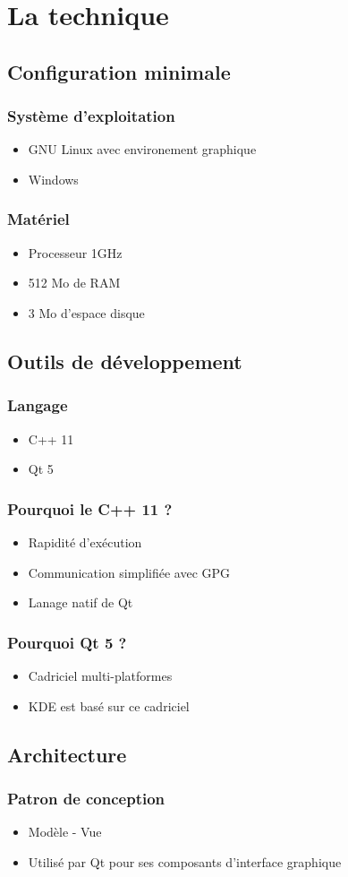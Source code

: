 \section{La technique}
\subsection{Configuration minimale}
\begin{frame}
  \frametitle{\color{white} Système d'exploitation}
  \begin{itemize}
    \item GNU Linux avec environement graphique
    \item Windows
  \end{itemize}
\end{frame}
\begin{frame}
  \frametitle{\color{white} Matériel}
  \begin{itemize}
    \item Processeur 1GHz
    \item 512 Mo de RAM
    \item 3 Mo d'espace disque
  \end{itemize}
\end{frame}
\subsection{Outils de développement}
\begin{frame}
  \frametitle{\color{white} Langage}
  \begin{itemize}
    \item C++ 11
    \item Qt 5
  \end{itemize}
\end{frame}
\begin{frame}
  \frametitle{\color{white} Pourquoi le C++ 11 ?}
  \begin{itemize}
    \item Rapidité d'exécution
    \item Communication simplifiée avec GPG
    \item Lanage natif de Qt
  \end{itemize}
\end{frame}
\begin{frame}
  \frametitle{\color{white} Pourquoi Qt 5 ?}
  \begin{itemize}
    \item Cadriciel multi-platformes
    \item KDE est basé sur ce cadriciel
  \end{itemize}
\end{frame}
\subsection{Architecture}
\begin{frame}
  \frametitle{\color{white} Patron de conception}
  \begin{itemize}
    \item Modèle - Vue
    \item Utilisé par Qt pour ses composants d'interface graphique
  \end{itemize}
\end{frame}
